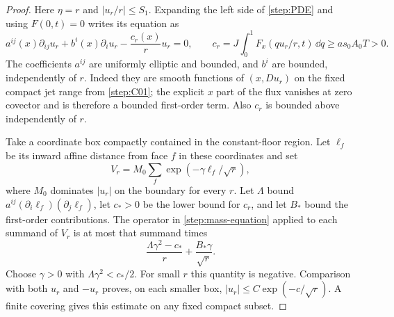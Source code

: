 \begin{proof}
Here $\eta=r$ and $|u_r/r|\le S_1$.  Expanding the left side of
\cref{step:PDE} and using $F(0,t)=0$ writes its equation as
\begin{equation}\label{step:mass-equation}
 a^{ij}(x)\partial_{ij}u_r+b^i(x)\partial_i u_r
 -\frac{c_r(x)}r u_r=0,
 \qquad
 c_r=J\int_0^1F_x(qu_r/r,t)\,\dd q\ge as_0A_0T>0.
\end{equation}
The coefficients $a^{ij}$ are uniformly elliptic and bounded, and $b^i$
are bounded, independently of $r$.  Indeed they are smooth functions of
$(x,Du_r)$ on the fixed compact jet range from \cref{step:C01}; the
explicit $x$ part of the flux vanishes at zero covector and is therefore
a bounded first-order term.  Also $c_r$ is bounded above independently
of $r$.

Take a coordinate box compactly contained in the constant-floor region.
Let $\ell_f$ be its inward affine distance from face $f$ in these
coordinates and set
\[
 V_r=M_0\sum_f\exp(-\gamma\ell_f/\sqrt r),
\]
where $M_0$ dominates $|u_r|$ on the boundary for every $r$.
Let $\Lambda$ bound $a^{ij}(\partial_i\ell_f)(\partial_j\ell_f)$,
let $c_*>0$ be the lower bound for $c_r$, and let $B_*$ bound the
first-order contributions.  The operator in \cref{step:mass-equation}
applied to each summand of $V_r$ is at most that summand times
\[
 \frac{\Lambda\gamma^2-c_*}{r}+\frac{B_*\gamma}{\sqrt r}.
\]
Choose $\gamma>0$ with $\Lambda\gamma^2<c_*/2$.  For small $r$ this
quantity is negative.  Comparison with both $u_r$ and $-u_r$ proves,
on each smaller box, $|u_r|\le C\exp(-c/\sqrt r)$.  A finite covering
gives this estimate on any fixed compact subset.


\end{proof}
